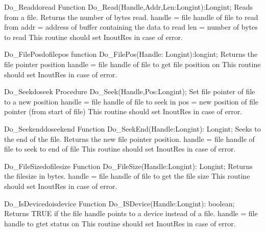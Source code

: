 \documentclass [a4paper,12pt]{article}
\begin{document}
\begin{functionl}{Do{\_}Read}{doread}
\Declaration
Function Do{\_}Read(Handle,Addr,Len:Longint):Longint;
\Description
Reads from a file. Returns the number of bytes read.
\Parameters
handle = file handle of file to read from
addr = address of buffer containing the data to read
len = number of bytes to read
\Notes
This routine should set InoutRes in case of error.
\end{functionl}

\begin{functionl}{Do{\_}FilePos}{dofilepos}
\Declaration
function Do{\_}FilePos(Handle: Longint):longint;
\Description
Returns the file pointer position
\Parameters
handle = file handle of file to get file position on
\Notes
This routine should set InoutRes in case of error.
\end{functionl}

\begin{procedurel}{Do{\_}Seek}{doseek}
\Declaration
Procedure Do{\_}Seek(Handle,Pos:Longint);
\Description
Set file pointer of file to a new position
\Parameters
handle = file handle of file to seek in
pos = new position of file pointer (from start of file)
\Notes
This routine should set InoutRes in case of error.
\end{procedurel}

\begin{functionl}{Do{\_}Seekend}{doseekend}
\Declaration
Function Do{\_}SeekEnd(Handle:Longint): Longint;
\Description
Seeks to the end of the file. Returns the
new file pointer position.
\Parameters
handle = file handle of file to seek to end of file
\Notes
This routine should set InoutRes in case of error.
\end{functionl}

\begin{functionl}{Do{\_}FileSize}{dofilesize}
\Declaration
Function Do{\_}FileSize(Handle:Longint): Longint;
\Description
Returns the filesize in bytes.
\Parameters
handle = file handle of file to get the file size
\Notes
This routine should set InoutRes in case of error.
\end{functionl}

\begin{functionl}{Do{\_}IsDevice}{doisdevice}
\Declaration
Function Do{\_}ISDevice(Handle:Longint): boolean;
\Description
Returns TRUE if the file handle points to a device 
instead of a file.
\Parameters
handle = file handle to gtet status on
\Notes
This routine should set InoutRes in case of error.
\end{functionl}
\end{document}
